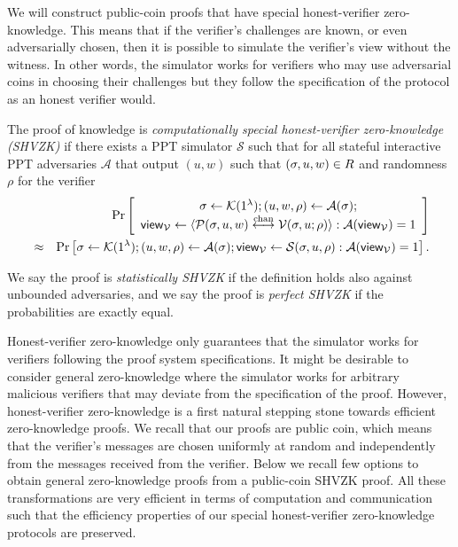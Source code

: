 We will construct public-coin proofs that have special honest-verifier zero-knowledge. This means that if the verifier's challenges are known, or even adversarially chosen, then it is possible to simulate the verifier's view without the witness.  In other words, the simulator works for verifiers who may use adversarial coins in choosing their challenges but they follow the specification of the protocol as an honest verifier would. 
\begin{definition}
The proof of knowledge is \emph{computationally special honest-verifier zero-knowledge (SHVZK)} if there exists a PPT simulator $\mathcal{S}$ such that for all stateful interactive PPT adversaries $\mathcal{A}$ that output $(u,w)$ such that $(\mathsf{\sigma},u,w)\in R$ and randomness $\rho$ for the verifier
\begin{eqnarray*}
&&\Pr \left[ \begin{array}{c}\mathsf{\sigma}\gets \mathcal{K}(1^{\lambda});(u, w, \rho) \leftarrow\mathcal{A}(\mathsf{\sigma}); \\
\mathsf{view}_{\mathcal{V}}\leftarrow \langle \mathcal{P}(\mathsf{\sigma},u,w)\overset{\textnormal{chan}}{\longleftrightarrow} \mathcal{V}(\mathsf{\sigma},u;\rho)\rangle: \mathcal{A}(\mathsf{view}_{\mathcal{V}})=1\end{array} \right]\\
&\approx &\Pr \left[ \mathsf{\sigma}\gets \mathcal{K}(1^{\lambda});(u, w, \rho) \leftarrow\mathcal{A}(\mathsf{\sigma}); \mathsf{view}_{\mathcal{V}}\leftarrow \mathcal{S}(\mathsf{\sigma},u,\rho): \mathcal{A}(\mathsf{view}_{\mathcal{V}})=1\right].
\end{eqnarray*}

We say the proof is \emph{statistically SHVZK} if the definition holds also against unbounded adversaries, and we say the proof is \emph{perfect SHVZK} if the probabilities are exactly equal.
\end{definition}


Honest-verifier zero-knowledge only guarantees that the simulator works for verifiers following the proof system specifications. It might be desirable to consider general zero-knowledge where the simulator works for arbitrary malicious verifiers that may deviate from the specification of the proof. However, honest-verifier zero-knowledge is a first natural stepping stone towards efficient zero-knowledge proofs. %
 We recall that our proofs are public coin, which means that the verifier's messages are chosen uniformly at random and independently from the messages received from the verifier. Below we recall few options to obtain general zero-knowledge proofs from a public-coin SHVZK proof. All these transformations are very efficient in terms of computation and communication such that the efficiency properties of our special honest-verifier zero-knowledge protocols are preserved. 


